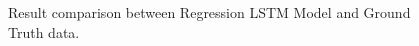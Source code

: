 \begin{figure}
\begin{center}
\end{center}
\decoRule
\caption[Result comparison between Regression LSTM Model and Ground Truth data]{Result comparison between Regression LSTM Model and Ground Truth data.}
\label{fig:regression-lstm-results}
\end{figure}
